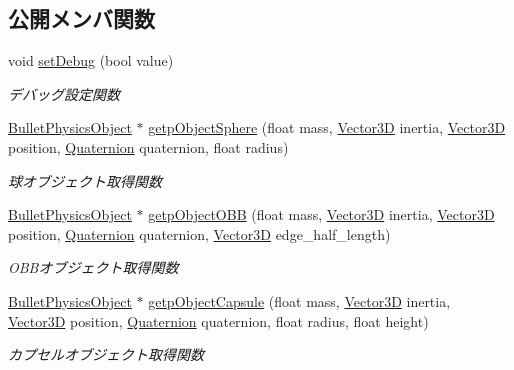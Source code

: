 \subsection*{公開メンバ関数}
\begin{DoxyCompactItemize}
\item 
void \mbox{\hyperlink{class_bullet_physics_manager_ad36b472d89cdd03e1037359fae2c1a37}{set\+Debug}} (bool value)
\begin{DoxyCompactList}\small\item\em デバッグ設定関数 \end{DoxyCompactList}\item 
\mbox{\hyperlink{class_bullet_physics_object}{Bullet\+Physics\+Object}} $\ast$ \mbox{\hyperlink{class_bullet_physics_manager_a6a5ed244e2925464f48c221fd5af68e4}{getp\+Object\+Sphere}} (float mass, \mbox{\hyperlink{class_vector3_d}{Vector3D}} inertia, \mbox{\hyperlink{class_vector3_d}{Vector3D}} position, \mbox{\hyperlink{_vector3_d_8h_a3ee38c9c46d9851e33a9a1113328dafc}{Quaternion}} quaternion, float radius)
\begin{DoxyCompactList}\small\item\em 球オブジェクト取得関数 \end{DoxyCompactList}\item 
\mbox{\hyperlink{class_bullet_physics_object}{Bullet\+Physics\+Object}} $\ast$ \mbox{\hyperlink{class_bullet_physics_manager_ab155f9a649643701d9ee7f88027c5616}{getp\+Object\+O\+BB}} (float mass, \mbox{\hyperlink{class_vector3_d}{Vector3D}} inertia, \mbox{\hyperlink{class_vector3_d}{Vector3D}} position, \mbox{\hyperlink{_vector3_d_8h_a3ee38c9c46d9851e33a9a1113328dafc}{Quaternion}} quaternion, \mbox{\hyperlink{class_vector3_d}{Vector3D}} edge\+\_\+half\+\_\+length)
\begin{DoxyCompactList}\small\item\em O\+B\+Bオブジェクト取得関数 \end{DoxyCompactList}\item 
\mbox{\hyperlink{class_bullet_physics_object}{Bullet\+Physics\+Object}} $\ast$ \mbox{\hyperlink{class_bullet_physics_manager_aa923016c3a46597009f0b399dee189ec}{getp\+Object\+Capsule}} (float mass, \mbox{\hyperlink{class_vector3_d}{Vector3D}} inertia, \mbox{\hyperlink{class_vector3_d}{Vector3D}} position, \mbox{\hyperlink{_vector3_d_8h_a3ee38c9c46d9851e33a9a1113328dafc}{Quaternion}} quaternion, float radius, float height)
\begin{DoxyCompactList}\small\item\em カプセルオブジェクト取得関数 \end{DoxyCompactList}\item 

\end{DoxyCompactItemize}
